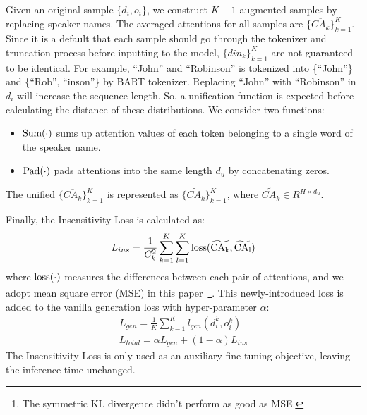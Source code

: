 Given an original sample $\{d_i, o_i\}$, we construct $K-1$ augmented samples by replacing speaker names. The averaged attentions for all samples are $\{\overline{CA_k}\}_{k=1}^K$. Since it is a default that each sample should go through the tokenizer and truncation process before inputting to the model, $\{din_k\}_{k=1}^K$ are not guaranteed to be identical. For example, ``John'' and ``Robinson'' is tokenized into \{``John''\} and \{``Rob'', ``inson''\} by BART tokenizer. Replacing ``John'' with ``Robinson'' in $d_i$ will increase the sequence length. So, a unification function is expected before calculating the distance of these distributions. We consider two functions: 
\begin{itemize}
\item $\rm{Sum(\cdot)}$ sums up attention values of each token belonging to a single word of the speaker name. 
\item $\rm{Pad(\cdot)}$ pads attentions into the same length $d_u$ by concatenating zeros.
\end{itemize}
The unified $\{\overline{CA_k}\}_{k=1}^K$ is represented as $\{\widetilde{CA_k}\}_{k=1}^K$, where $\widetilde{CA_k}\in R^{H\times d_u}$.


Finally, the Insensitivity Loss is calculated as:
\begin{equation}
	L_{ins} = \frac{1}{C_{k}^2} \sum_{k=1}^{K}\sum_{l=1}^{K} \rm{loss}(\widetilde{CA_k}, \widetilde{CA_l})
\end{equation}
where $\rm{loss}(\cdot)$ measures the differences between each pair of attentions, and we adopt mean square error (MSE) in this paper~\footnote{The symmetric KL divergence didn't perform as good as MSE.}. This newly-introduced loss is added to the vanilla generation loss with hyper-parameter $\alpha$:
\begin{equation}
	\begin{aligned}
		L_{gen} =  \frac{1}{K}\sum_{k-1}^{K} l_{gen}(d_i^k, o_i^k) \\
		L_{total} = \alpha L_{gen} + (1-\alpha) L_{ins}
	\end{aligned}
\end{equation}
The Insensitivity Loss is only used as an auxiliary fine-tuning objective, leaving the inference time unchanged.

